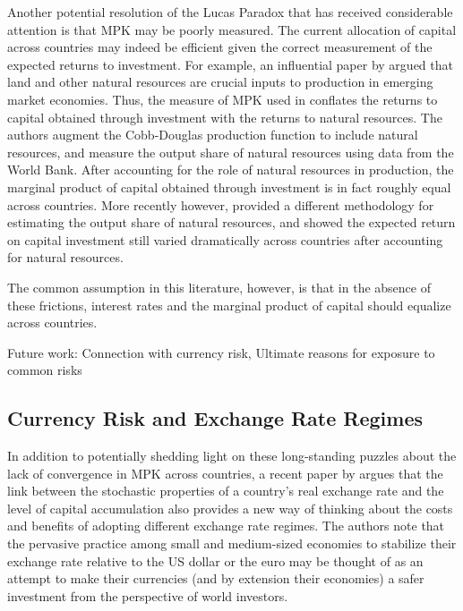 \documentclass{ar-1col}
\begin{document}
Another potential resolution of the Lucas Paradox that has received considerable attention is that MPK may be poorly measured. The current allocation of capital across countries may indeed be efficient given the correct measurement of the expected returns to investment. For example, an influential paper by \citet{CaselliFeyrer2007} argued that land and other natural resources are crucial inputs to production in emerging market economies. Thus, the measure of MPK used in \citet{Lucas1990} conflates the returns to capital obtained through investment with the returns to natural resources. The authors augment the Cobb-Douglas production function to include natural resources, and measure the output share of natural resources using data from the World Bank. After accounting for the role of natural resources in production, the marginal product of capital obtained through investment is in fact roughly equal across countries. More recently however, \citet{Monge-Naranjoetal2019} provided a different methodology for estimating the output share of natural resources, and showed the expected return on capital investment still varied dramatically across countries after accounting for natural resources.

The common assumption in this literature, however, is that in the absence of these frictions, interest rates and the marginal product of capital should equalize across countries. 

Future work: Connection with currency risk, Ultimate reasons for exposure to common risks


\subsection{Currency Risk and Exchange Rate Regimes\label{sec_regimes}}

In addition to potentially shedding light on these long-standing puzzles about the lack of convergence in MPK across countries, a recent paper by \citet{HassanMertensZhang2020} argues that the link between the stochastic properties of a country's real exchange rate and the level of capital accumulation also provides a new way of thinking about the costs and benefits of adopting different exchange rate regimes. The authors note that the pervasive practice among small and medium-sized economies to stabilize their exchange rate relative to the US dollar or the euro \citep{ilzetzki2018exchange} may be thought of as an attempt to make their currencies (and by extension their economies) a safer investment from the perspective of world investors. 
\end{document}

